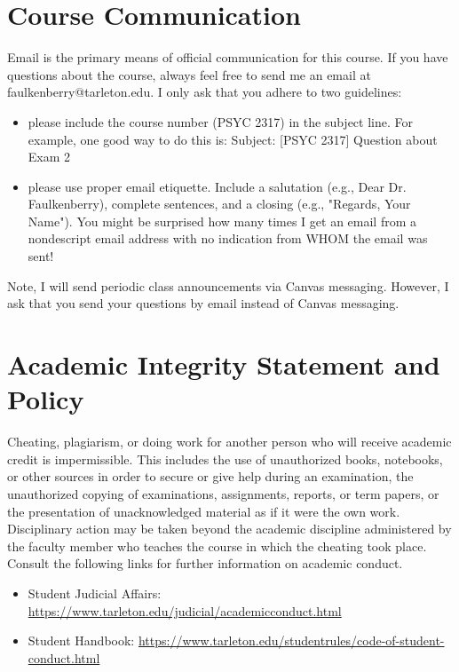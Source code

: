 \documentclass[10pt]{article}
\begin{document}
\section*{Course Communication}
\label{sec:org84e324b}

Email is the primary means of official communication for this course. If you have questions about the course, always feel free to send me an email at faulkenberry@tarleton.edu.  I only ask that you adhere to two guidelines:
\begin{itemize}
\item please include the course number (PSYC 2317) in the subject line.  For example, one good way to do this is:  Subject: [PSYC 2317] Question about Exam 2
\item please use proper email etiquette.  Include a salutation (e.g., Dear Dr. Faulkenberry), complete sentences, and a closing (e.g., "Regards, Your Name").  You might be surprised how many times I get an email from a nondescript email address with no indication from WHOM the email was sent!
\end{itemize}

Note, I will send periodic class announcements via Canvas messaging. However, I ask that you send your questions by email instead of Canvas messaging. 

\section*{Academic Integrity Statement and Policy}
\label{sec:orge6c15e4}

Cheating, plagiarism, or doing work for another person who will receive academic credit is impermissible. This includes the use of unauthorized books, notebooks, or other sources in order to secure or give help during an examination, the unauthorized copying of examinations, assignments, reports, or term papers, or the presentation of unacknowledged material as if it were the own work. Disciplinary action may be taken beyond the academic discipline administered by the faculty member who teaches the course in which the cheating took place. Consult the following links for further information on academic conduct. 
\begin{itemize}
\item Student Judicial Affairs: \url{https://www.tarleton.edu/judicial/academicconduct.html}
\item Student Handbook: \url{https://www.tarleton.edu/studentrules/code-of-student-conduct.html}
\end{itemize}
\end{document}
